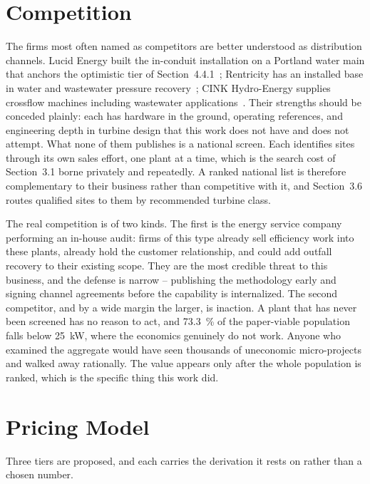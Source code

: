 \documentclass[12pt,letterpaper]{report}
\begin{document}
\section{Competition}

The firms most often named as competitors are better understood as distribution
channels. Lucid Energy built the in-conduit installation on a Portland water main
that anchors the optimistic tier of Section~4.4.1~\cite{ferc_p14498,lucidpipe};
Rentricity has an installed base in water and wastewater pressure
recovery~\cite{rentricity}; CINK Hydro-Energy supplies crossflow machines including
wastewater applications~\cite{cink}. Their strengths should be conceded plainly:
each has hardware in the ground, operating references, and engineering depth in
turbine design that this work does not have and does not attempt. What none of them
publishes is a national screen. Each identifies sites through its own sales effort,
one plant at a time, which is the search cost of Section~3.1 borne privately and
repeatedly. A ranked national list is therefore complementary to their business
rather than competitive with it, and Section~3.6 routes qualified sites to them by
recommended turbine class.

The real competition is of two kinds. The first is the energy service company
performing an in-house audit: firms of this type already sell efficiency work into
these plants, already hold the customer relationship, and could add outfall
recovery to their existing scope. They are the most credible threat to this
business, and the defense is narrow -- publishing the methodology early and signing
channel agreements before the capability is internalized. The second competitor, and
by a wide margin the larger, is inaction. A plant that has never been screened has no
reason to act, and 73.3~\% of the paper-viable population falls below 25~kW, where
the economics genuinely do not work. Anyone who examined the aggregate would have
seen thousands of uneconomic micro-projects and walked away rationally. The value
appears only after the whole population is ranked, which is the specific thing this
work did.

\section{Pricing Model}

Three tiers are proposed, and each carries the derivation it rests on rather than a
chosen number.
\end{document}
